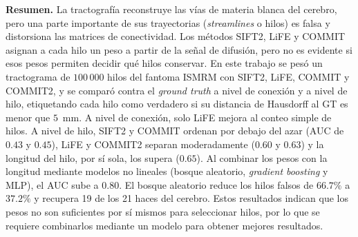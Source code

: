 \documentclass[11pt,a4paper]{article}
\begin{document}
\vspace{0.6em}
\begin{center}
\begin{minipage}{0.9\textwidth}
\small
\textbf{Resumen.}\;
La tractografía reconstruye las vías de materia blanca del cerebro, pero una parte importante de sus trayectorias (\textit{streamlines} o hilos) es falsa y distorsiona las matrices de conectividad. Los métodos SIFT2, LiFE y COMMIT asignan a cada hilo un peso a partir de la señal de difusión, pero no es evidente si esos pesos permiten decidir qué hilos conservar. En este trabajo se pesó un tractograma de $100\,000$ hilos del fantoma ISMRM con SIFT2, LiFE, COMMIT y COMMIT2, y se comparó contra el \textit{ground truth} a nivel de conexión y a nivel de hilo, etiquetando cada hilo como verdadero si su distancia de Hausdorff al GT es menor que $5$~mm. A nivel de conexión, solo LiFE mejora al conteo simple de hilos. A nivel de hilo, SIFT2 y COMMIT ordenan por debajo del azar (AUC de $0.43$ y $0.45$), LiFE y COMMIT2 separan moderadamente ($0.60$ y $0.63$) y la longitud del hilo, por sí sola, los supera ($0.65$). Al combinar los pesos con la longitud mediante modelos no lineales (bosque aleatorio, \textit{gradient boosting} y MLP), el AUC sube a $0.80$. El bosque aleatorio reduce los hilos falsos de $66.7\%$ a $37.2\%$ y recupera 19 de los 21 haces del cerebro. Estos resultados indican que los pesos no son suficientes por sí mismos para seleccionar hilos, por lo que se requiere combinarlos mediante un modelo para obtener mejores resultados. 





\end{minipage}
\end{center}
\end{document}
